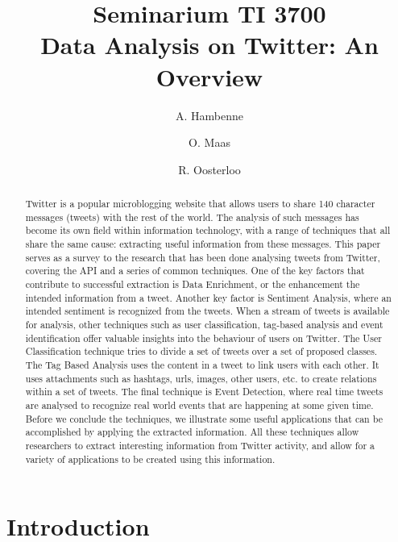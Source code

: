 \documentclass{article}
\title{Seminarium TI 3700\\ Data Analysis on Twitter: An Overview}
\author{A. Hambenne  \and
    O. Maas \and
    R. Oosterloo}
\date{}
\begin{document}
\maketitle
\thispagestyle{empty}

\begin{abstract}

Twitter is a popular microblogging website that allows users to share 140 character messages (tweets) with the rest of the world.
The analysis of such messages has become its own field within information technology, with a range of techniques that all share the same cause:
extracting useful information from these messages. This paper serves as a survey to the research that has been done analysing tweets from Twitter,
covering the API and a series of common techniques. One of the key factors that contribute to successful extraction is Data Enrichment, or the enhancement
the intended information from a tweet. Another key factor is Sentiment Analysis, where an intended sentiment is recognized from the tweets.
When a stream of tweets is available for analysis, other techniques such as user classification, tag-based analysis and event identification offer valuable
insights into the behaviour of users on Twitter. The User Classification technique tries to divide a set of tweets over a set of proposed classes. 
The Tag Based Analysis uses the content in a tweet to link users with each other. It uses attachments such as hashtags, urls, images, other users, etc. to
create relations within a set of tweets. The final technique is Event Detection, where real time tweets are analysed to recognize real world events that
are happening at some given time. Before we conclude the techniques, we illustrate some useful applications that can be accomplished by applying the extracted
information. All these techniques allow researchers to extract interesting information from Twitter activity, and allow
for a variety of applications to be created using this information.
\end{abstract}


\section{Introduction}
\end{document}

